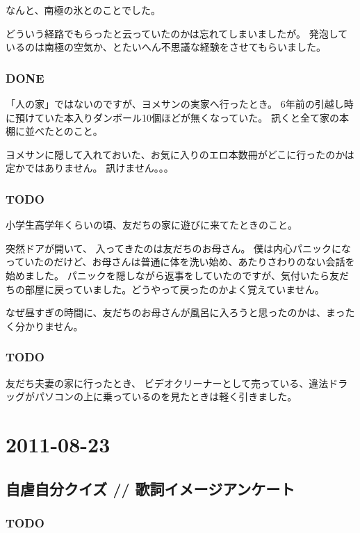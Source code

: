 \documentclass[11pt]{article}
\begin{document}
なんと、南極の氷とのことでした。

どういう経路でもらったと云っていたのかは忘れてしまいましたが。
発泡しているのは南極の空気か、とたいへん不思議な経験をさせてもらいました。
\subsubsection{\textbf{DONE}}
\label{sec-79_1_2}

「人の家」ではないのですが、ヨメサンの実家へ行ったとき。
6年前の引越し時に預けていた本入りダンボール10個ほどが無くなっていた。
訊くと全て家の本棚に並べたとのこと。

ヨメサンに隠して入れておいた、お気に入りのエロ本数冊がどこに行ったのかは定かではありません。
訊けません。。。
\subsubsection{\textbf{TODO}}
\label{sec-79_1_3}

小学生高学年くらいの頃、友だちの家に遊びに来てたときのこと。

突然ドアが開いて、
入ってきたのは友だちのお母さん。
僕は内心パニックになっていたのだけど、お母さんは普通に体を洗い始め、あたりさわりのない会話を始めました。
パニックを隠しながら返事をしていたのですが、気付いたら友だちの部屋に戻っていました。どうやって戻ったのかよく覚えていません。

なぜ昼すぎの時間に、友だちのお母さんが風呂に入ろうと思ったのかは、まったく分かりません。
\subsubsection{\textbf{TODO}}
\label{sec-79_1_4}

友だち夫妻の家に行ったとき、
ビデオクリーナーとして売っている、違法ドラッグがパソコンの上に乗っているのを見たときは軽く引きました。
\section{2011-08-23}
\label{sec-80}
\subsection{自虐自分クイズ // 歌詞イメージアンケート}
\label{sec-80_1}
\subsubsection{\textbf{TODO}}
\label{sec-80_1_1}
\end{document}
